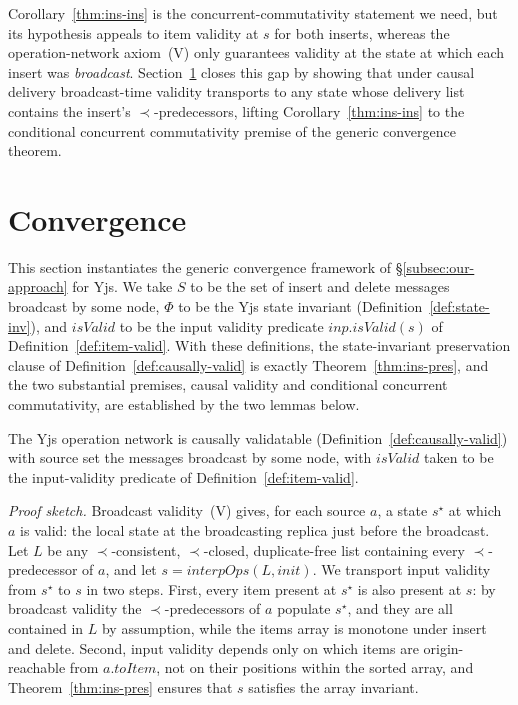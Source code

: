 \documentclass[sigplan,screen]{acmart}
\newcommand{\leanref}[1]{\texttt{#1}}
\newcommand{\hb}{\mathrel{\prec}}
\newcommand{\interpOps}{\mathit{interpOps}}
\newcommand{\init}{\mathit{init}}
\begin{document}
\smallskip
\noindent
Corollary~\ref{thm:ins-ins} is the concurrent-commutativity statement we
need, but its hypothesis appeals to item validity at $s$ for both
inserts, whereas the operation-network axiom~(V) only guarantees
validity at the state at which each insert was \emph{broadcast}.
Section~\ref{sec:convergence} closes this gap by showing that under
causal delivery broadcast-time validity transports to any state whose
delivery list contains the insert's $\hb$-predecessors, lifting
Corollary~\ref{thm:ins-ins} to the conditional concurrent commutativity
premise of the generic convergence theorem.

\section{Convergence}
\label{sec:convergence}

This section instantiates the generic convergence framework of
\S\ref{subsec:our-approach} for Yjs.  We take $S$ to be the set of
insert and delete messages broadcast by some node, $\Phi$ to be the
Yjs state invariant (Definition~\ref{def:state-inv}), and
$\mathit{isValid}$ to be the input validity predicate
$\mathit{inp}.\mathit{isValid}(s)$ of
Definition~\ref{def:item-valid}.  With these definitions, the
state-invariant preservation clause of
Definition~\ref{def:causally-valid} is exactly
Theorem~\ref{thm:ins-pres}, and the two substantial premises, causal
validity and conditional concurrent commutativity, are established by
the two lemmas below.

\begin{lemma}[Yjs causal validity (\leanref{isValidState\_insert\_causally})]
\label{lem:yjs-causal-valid}
The Yjs operation network is causally validatable
(Definition~\ref{def:causally-valid}) with source set the messages
broadcast by some node, with $\mathit{isValid}$ taken to be the
input-validity predicate of Definition~\ref{def:item-valid}.
\end{lemma}

\noindent\textit{Proof sketch.}
Broadcast validity~(V) gives, for each source $a$, a state $s^\star$ at
which $a$ is valid: the local state at the broadcasting replica just
before the broadcast.  Let $L$ be any $\hb$-consistent, $\hb$-closed,
duplicate-free list containing every $\hb$-predecessor of $a$, and let
$s = \interpOps(L, \init)$.  We transport input validity from $s^\star$
to $s$ in two steps.  First, every item present at $s^\star$ is also
present at $s$: by broadcast validity the $\hb$-predecessors of $a$
populate $s^\star$, and they are all contained in $L$ by assumption,
while the items array is monotone under insert and delete.  Second,
input validity depends only on which items are origin-reachable from
$a.\mathit{toItem}$, not on their positions within the sorted array,
and Theorem~\ref{thm:ins-pres} ensures that $s$ satisfies the array
invariant.
\end{document}
